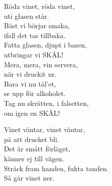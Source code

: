 \documentclass[a6paper, 10pt, twoside]{article}
\begin{document}
\noindent
\begin{center}
\end{center}
\begin{lyrics}
Röda vinet, röda vinet,\\
uti glasen står.\\
Bäst vi börjar smaka,\\
ifall det tas tillbaka.\\
Fatta glasen, djupt i basen,\\
utbringar vi SKÅL!
\vspace{5pt}\\
Mera, mera, vin servera,\\
när vi druckit ur.\\
Bara vi nu tål'et,\\
se upp för alkoholet.\\
Tag nu skvätten, i falsetten,\\
om igen en SKÅL!
\end{lyrics}
\vspace{40pt}
\begin{center}
\end{center}
\begin{lyrics}
Vinet väntar, vinet väntar,\\
på att drucket bli.\\
Det är smått förläget,\\
känner ej till vägen.\\
Sträck fram handen, fukta tanden.\\
Så går vinet ner.
\end{lyrics}
\end{document}
